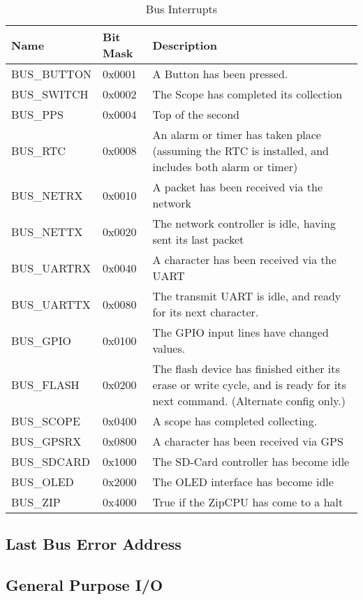 \documentclass{gqtekspec}
\begin{document}
\begin{table}[htbp]
\begin{center}\begin{tabular}{|p{0.9in}|p{0.75in}|p{3.75in}|}\hline
\rowcolor[gray]{0.85} Name & Bit Mask & Description \\\hline\hline
BUS\_BUTTON & 0x0001 & A Button has been pressed. \\\hline
BUS\_SWITCH & 0x0002 & The Scope has completed its collection\\\hline
BUS\_PPS    & 0x0004 & Top of the second\\\hline
BUS\_RTC    & 0x0008 & An alarm or timer has taken place (assuming the RTC
		is installed, and includes both alarm or timer)\\\hline
BUS\_NETRX & 0x0010 & A packet has been received via the network\\\hline
BUS\_NETTX & 0x0020 & The network controller is idle, having sent its
			last packet\\\hline
BUS\_UARTRX & 0x0040 & A character has been received via the UART\\\hline
BUS\_UARTTX & 0x0080 & The transmit UART is idle, and ready for its next
		character.\\\hline
BUS\_GPIO   & 0x0100 & The GPIO input lines have changed values.\\\hline
BUS\_FLASH  & 0x0200 & The flash device has finished either its erase or
		write cycle, and is ready for its next command. (Alternate
	config only.)\\\hline
BUS\_SCOPE  & 0x0400 & A scope has completed collecting.\\\hline
BUS\_GPSRX  & 0x0800 & A character has been received via GPS\\\hline
BUS\_SDCARD & 0x1000 & The SD-Card controller has become idle\\\hline
BUS\_OLED   & 0x2000 & The OLED interface has become idle\\\hline
BUS\_ZIP    & 0x4000 & True if the ZipCPU has come to a halt\\\hline
\end{tabular}
\caption{Bus Interrupts}\label{tbl:bus-ints}
\end{center}\end{table}

\subsection{Last Bus Error Address}
\subsection{General Purpose I/O}
\end{document}

